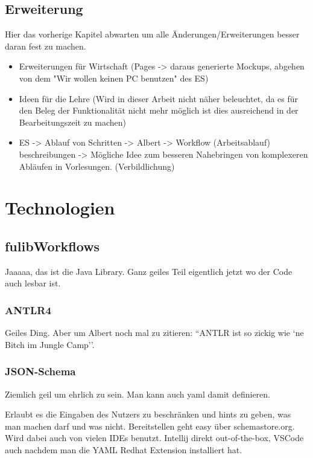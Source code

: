 \subsection{Erweiterung}\label{subsec:erweiterung}
\todo Hier das vorherige Kapitel abwarten um alle Änderungen/Erweiterungen besser daran fest zu machen.
\begin{itemize}
    \item Erweiterungen für Wirtschaft (Pages -> daraus generierte Mockups, abgehen von dem "Wir wollen keinen PC benutzen" des ES)
    \item Ideen für die Lehre (Wird in dieser Arbeit nicht näher beleuchtet, da es für den Beleg der Funktionalität nicht mehr möglich ist dies ausreichend in der Bearbeitungszeit zu machen)
    \item ES -> Ablauf von Schritten -> Albert -> Workflow (Arbeitsablauf) beschreibungen -> Mögliche Idee zum besseren Nahebringen von komplexeren Abläufen in Vorlesungen. (Verbildlichung)
\end{itemize}

\section{Technologien}\label{sec:technologien}
\todo

\subsection{fulibWorkflows}\label{subsec:fulibworkflows}
\todo
Jaaaaa, das ist die Java Library.
Ganz geiles Teil eigentlich jetzt wo der Code auch lesbar ist.

\subsubsection{ANTLR4}\label{subsubsec:antlr4}
\todo
Geiles Ding.
Aber um Albert noch mal zu zitieren: ``ANTLR ist so zickig wie `ne Bitch im Jungle Camp''.

\subsubsection{JSON-Schema}\label{subsubsec:json-schema}
\todo
Ziemlich geil um ehrlich zu sein.
Man kann auch yaml damit definieren.

Erlaubt es die Eingaben des Nutzers zu beschränken und hints zu geben, was man machen darf
und was nicht.
Bereitstellen geht easy über schemastore.org.
Wird dabei auch von vielen IDEs benutzt.
Intellij direkt out-of-the-box, VSCode auch nachdem man die YAML Redhat Extension installiert hat.

